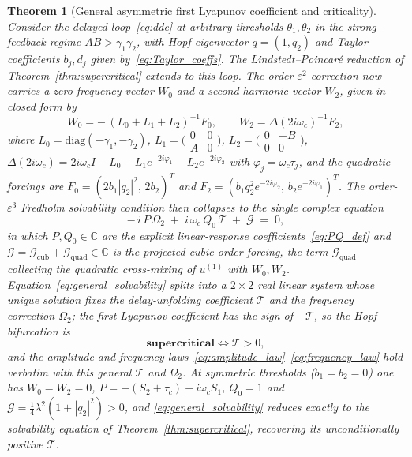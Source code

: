 \documentclass[sn-mathphys,Numbered]{sn-jnl}
\theoremstyle{thmstyleone}
\newtheorem{theorem}{Theorem}
\theoremstyle{thmstyletwo}
\theoremstyle{thmstylethree}
\begin{document}
\begin{theorem}[General asymmetric first Lyapunov coefficient and criticality]
\label{thm:general_lyapunov}
Consider the delayed loop~\eqref{eq:dde} at \emph{arbitrary} thresholds
$\theta_1,\theta_2$ in the strong-feedback regime $AB>\gamma_1\gamma_2$,
with Hopf eigenvector $q=(1,q_2)$ and Taylor coefficients
$b_j,d_j$ given by~\eqref{eq:Taylor_coeffs}. The Lindstedt--Poincar\'e
reduction of Theorem~\ref{thm:supercritical} extends to this loop. The
order-$\varepsilon^{2}$ correction now carries a zero-frequency vector
$W_0$ and a second-harmonic vector $W_2$, given in closed form by
\begin{equation}
W_0=-\,(L_0+L_1+L_2)^{-1}F_0,
\qquad
W_2=\Delta(2i\omega_c)^{-1}F_2,
\label{eq:W0W2}
\end{equation}
where $L_0=\mathrm{diag}(-\gamma_1,-\gamma_2)$,
$L_1=\bigl(\begin{smallmatrix}0&0\\A&0\end{smallmatrix}\bigr)$,
$L_2=\bigl(\begin{smallmatrix}0&-B\\0&0\end{smallmatrix}\bigr)$,
$\Delta(2i\omega_c)=2i\omega_c I-L_0-L_1e^{-2i\varphi_1}-L_2e^{-2i\varphi_2}$
with $\varphi_j=\omega_c\tau_j$, and the quadratic forcings are
$F_0=(2b_1|q_2|^{2},\,2b_2)^{T}$ and
$F_2=(b_1q_2^{2}e^{-2i\varphi_2},\,b_2e^{-2i\varphi_1})^{T}$.
The order-$\varepsilon^{3}$ Fredholm solvability condition then collapses
to the single complex equation
\begin{equation}
-\,i\,P\,\Omega_2\;+\;i\,\omega_c\,Q_0\,\mathcal{T}\;+\;\mathcal{G}\;=\;0,
\label{eq:general_solvability}
\end{equation}
in which $P,Q_0\in\mathbb{C}$ are the explicit linear-response
coefficients~\eqref{eq:PQ_def} and
$\mathcal{G}=\mathcal{G}_{\mathrm{cub}}+\mathcal{G}_{\mathrm{quad}}\in\mathbb{C}$
is the projected cubic-order forcing, the term $\mathcal{G}_{\mathrm{quad}}$
collecting the quadratic cross-mixing of $u^{(1)}$ with $W_0,W_2$.
Equation~\eqref{eq:general_solvability} splits into a $2\times2$ real
linear system whose unique solution fixes the delay-unfolding
coefficient $\mathcal{T}$ and the frequency correction $\Omega_2$; the first
Lyapunov coefficient has the sign of $-\mathcal{T}$, so the Hopf bifurcation is
\begin{equation}
\textbf{supercritical} \iff \mathcal{T}>0 ,
\label{eq:general_criterion}
\end{equation}
and the amplitude and frequency laws~\eqref{eq:amplitude_law}--\eqref{eq:frequency_law}
hold verbatim with this general $\mathcal{T}$ and $\Omega_2$. At symmetric
thresholds ($b_1=b_2=0$) one has $W_0=W_2=0$,
$P=-(S_2+\tau_c)+i\omega_c S_1$, $Q_0=1$ and
$\mathcal{G}=\tfrac14\lambda^{2}(1+|q_2|^{2})>0$, and
\eqref{eq:general_solvability} reduces \emph{exactly} to the solvability
equation of Theorem~\ref{thm:supercritical}, recovering its
unconditionally positive $\mathcal{T}$.
\end{theorem}
\end{document}
